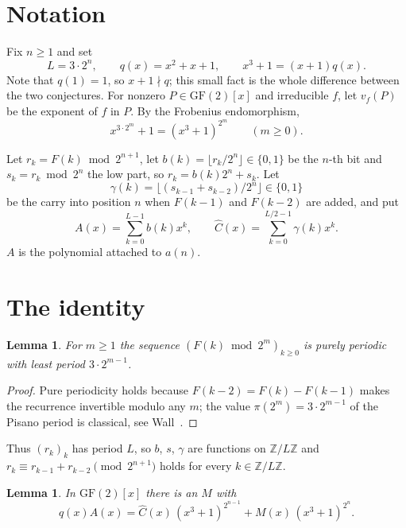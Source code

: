 \documentclass[11pt,a4paper]{article}
\theoremstyle{plain}
\newtheorem{lemma}[theorem]{Lemma}
\theoremstyle{definition}
\newcommand{\Chat}{\widehat{C}}
\begin{document}
\section{Notation}

Fix $n\ge1$ and set
\[
  L=3\cdot2^{n},\qquad q(x)=x^{2}+x+1,\qquad x^{3}+1=(x+1)q(x).
\]
Note that $q(1)=1$, so $x+1\nmid q$; this small fact is the whole difference between the
two conjectures. For nonzero $P\in\mathrm{GF}(2)[x]$ and irreducible $f$, let $v_{f}(P)$ be
the exponent of $f$ in $P$. By the Frobenius endomorphism,
\begin{equation}\label{eq:frob}
  x^{3\cdot2^{m}}+1=(x^{3}+1)^{2^{m}}\qquad(m\ge0).
\end{equation}

Let $r_{k}=F(k)\bmod2^{n+1}$, let $b(k)=\lfloor r_{k}/2^{n}\rfloor\in\{0,1\}$ be the $n$-th
bit and $s_{k}=r_{k}\bmod2^{n}$ the low part, so $r_{k}=b(k)2^{n}+s_{k}$. Let
\[
  \gamma(k)=\bigl\lfloor(s_{k-1}+s_{k-2})/2^{n}\bigr\rfloor\in\{0,1\}
\]
be the carry into position $n$ when $F(k-1)$ and $F(k-2)$ are added, and put
\[
  A(x)=\sum_{k=0}^{L-1}b(k)x^{k},\qquad \Chat(x)=\sum_{k=0}^{L/2-1}\gamma(k)x^{k}.
\]
$A$ is the polynomial attached to $a(n)$.

\section{The identity}

\begin{lemma}\label{lem:pisano}
For $m\ge1$ the sequence $(F(k)\bmod2^{m})_{k\ge0}$ is purely periodic with least period
$3\cdot2^{m-1}$.
\end{lemma}

\begin{proof}
Pure periodicity holds because $F(k-2)=F(k)-F(k-1)$ makes the recurrence invertible modulo
any $m$; the value $\pi(2^{m})=3\cdot2^{m-1}$ of the Pisano period is classical, see
Wall~\cite{wall}.
\end{proof}

Thus $(r_{k})_{k}$ has period $L$, so $b$, $s$, $\gamma$ are functions on
$\mathbb{Z}/L\mathbb{Z}$ and $r_{k}\equiv r_{k-1}+r_{k-2}\pmod{2^{n+1}}$ holds for every
$k\in\mathbb{Z}/L\mathbb{Z}$.

\begin{lemma}\label{lem:id}
In $\mathrm{GF}(2)[x]$ there is an $M$ with
\begin{equation}\label{eq:main}
  q(x)A(x)=\Chat(x)\,(x^{3}+1)^{2^{n-1}}+M(x)\,(x^{3}+1)^{2^{n}}.
\end{equation}
\end{lemma}
\end{document}
